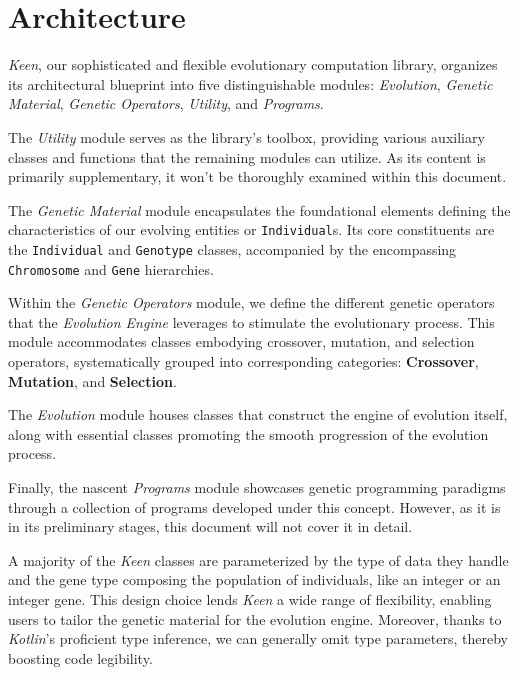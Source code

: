 \section{Architecture}
\label{sec:architecture}
  \textit{Keen}, our sophisticated and flexible evolutionary computation
  library, organizes its architectural blueprint into five distinguishable
  modules: \textit{Evolution}, \textit{Genetic Material},
  \textit{Genetic Operators}, \textit{Utility}, and \textit{Programs}.

  The \textit{Utility} module serves as the library's toolbox, providing various 
  auxiliary classes and functions that the remaining modules can utilize.
  As its content is primarily supplementary, it won't be thoroughly examined 
  within this document.

  The \textit{Genetic Material} module encapsulates the foundational elements 
  defining the characteristics of our evolving entities or \texttt{Individual}s.
  Its core constituents are the \texttt{Individual} and \texttt{Genotype} 
  classes, accompanied by the encompassing \texttt{Chromosome} and \texttt{Gene} 
  hierarchies.

  Within the \textit{Genetic Operators} module, we define the different genetic 
  operators that the \textit{Evolution Engine} leverages to stimulate the 
  evolutionary process.
  This module accommodates classes embodying crossover, mutation, and selection 
  operators, systematically grouped into corresponding categories: 
  \textbf{Crossover}, \textbf{Mutation}, and \textbf{Selection}.

  The \textit{Evolution} module houses classes that construct the engine of 
  evolution itself, along with essential classes promoting the smooth 
  progression of the evolution process.

  Finally, the nascent \textit{Programs} module showcases genetic programming 
  paradigms through a collection of programs developed under this concept.
  However, as it is in its preliminary stages, this document will not cover it 
  in detail.

  A majority of the \textit{Keen} classes are parameterized by the type of data 
  they handle and the gene type composing the population of individuals, like an 
  integer or an integer gene.
  This design choice lends \textit{Keen} a wide range of flexibility, enabling 
  users to tailor the genetic material for the evolution engine.
  Moreover, thanks to \textit{Kotlin}'s proficient type inference, we can 
  generally omit type parameters, thereby boosting code legibility.

